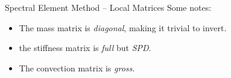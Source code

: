 \begin{frame}{Spectral Element Method -- Local Matrices}
  Some notes:
  \begin{itemize}
    \item The mass matrix is \emph{diagonal}, making it trivial to invert.
    \item the stiffness matrix is \emph{full} but \emph{SPD}.
    \item The convection matrix is \emph{gross}.
  \end{itemize}
\end{frame}